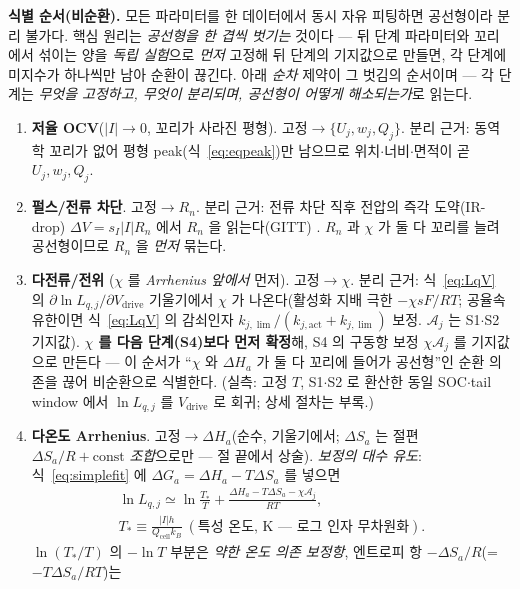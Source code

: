 \documentclass[11pt,a4paper]{article}
\newcommand{\drive}{\mathrm{drive}}
\newcommand{\cell}{\mathrm{cell}}
\begin{document}
\textbf{식별 순서(비순환).} 모든 파라미터를 한 데이터에서 동시 자유 피팅하면 공선형이라 분리 불가다. 핵심 원리는
\emph{공선형을 한 겹씩 벗기는} 것이다 — 뒤 단계 파라미터와 꼬리에서 섞이는 양을 \emph{독립 실험}으로 \emph{먼저}
고정해 뒤 단계의 기지값으로 만들면, 각 단계에 미지수가 하나씩만 남아 순환이 끊긴다. 아래 \emph{순차} 제약이 그
벗김의 순서이며 — 각 단계는 \emph{무엇을 고정하고, 무엇이 분리되며, 공선형이 어떻게 해소되는가}로 읽는다.
\begin{enumerate}[label=\textbf{S\arabic*.},leftmargin=2.6em,itemsep=2pt]
\item \textbf{저율 OCV}($|I|\to0$, 꼬리가 사라진 평형). 고정$\to\{U_j,w_j,Q_j\}$. 분리 근거: 동역학 꼬리가
  없어 평형 peak(식~\eqref{eq:eqpeak})만 남으므로 위치$\cdot$너비$\cdot$면적이 곧 $U_j,w_j,Q_j$.
\item \textbf{펄스/전류 차단}. 고정$\to R_n$. 분리 근거: 전류 차단 직후 전압의 즉각 도약(IR-drop) $\Delta V=
  s_I|I|R_n$ 에서 $R_n$ 을 읽는다(GITT) \cite{weppner1977}. $R_n$ 과 $\chi$ 가 둘 다 꼬리를 늘려 공선형이므로
  $R_n$ 을 \emph{먼저} 묶는다.
\item \textbf{다전류/전위} ($\chi$ 를 \emph{Arrhenius 앞에서} 먼저). 고정$\to\chi$. 분리 근거: 식~\eqref{eq:LqV} 의
  $\partial\ln L_{q,j}/\partial V_\drive$ 기울기에서 $\chi$ 가 나온다(활성화 지배 극한 $-\chi sF/RT$; 공율속 유한이면
  식~\eqref{eq:LqV} 의 감쇠인자 $k_{j,\lim}/(k_{j,\mathrm{act}}+k_{j,\lim})$ 보정. $\mathcal A_j$ 는 S1$\cdot$S2 기지값). \textbf{$\chi$ 를 다음 단계(S4)보다 먼저 확정}해, S4 의 구동항 보정 $\chi\mathcal A_j$ 를 기지값으로
  만든다 — 이 순서가 ``$\chi$ 와 $\Delta H_a$ 가 둘 다 꼬리에 들어가 공선형''인 순환 의존을 끊어 비순환으로 식별한다.
  (실측: 고정 $T$, S1$\cdot$S2 로 환산한 동일 SOC$\cdot$tail window 에서 $\ln L_{q,j}$ 를 $V_\drive$ 로 회귀; 상세 절차는 부록.)
\item \textbf{다온도 Arrhenius}. 고정$\to\Delta H_a$(순수, 기울기에서; $\Delta S_a$ 는 절편 $\Delta S_a/R+\text{const}$
  \emph{조합}으로만 — 절 끝에서 상술). \emph{보정의 대수 유도}: 식~\eqref{eq:simplefit}
  에 $\Delta G_a=\Delta H_a-T\Delta S_a$ 를 넣으면
  \begin{equation*}
  \begin{gathered}
  \ln L_{q,j}\simeq\ln\frac{T_*}{T}+\frac{\Delta H_a-T\Delta S_a-\chi\mathcal A_j}{RT},\\[2pt]
  T_*\equiv\frac{|I|h}{Q_\cell k_B}\ (\text{특성 온도, K — 로그 인자 무차원화}).
  \end{gathered}
  \end{equation*}
  $\ln(T_*/T)$ 의 $-\ln T$ 부분은 \emph{약한 온도 의존 보정항}, 엔트로피 항 $-\Delta S_a/R$(=$-T\Delta S_a/RT$)는

\end{enumerate}
\end{document}
